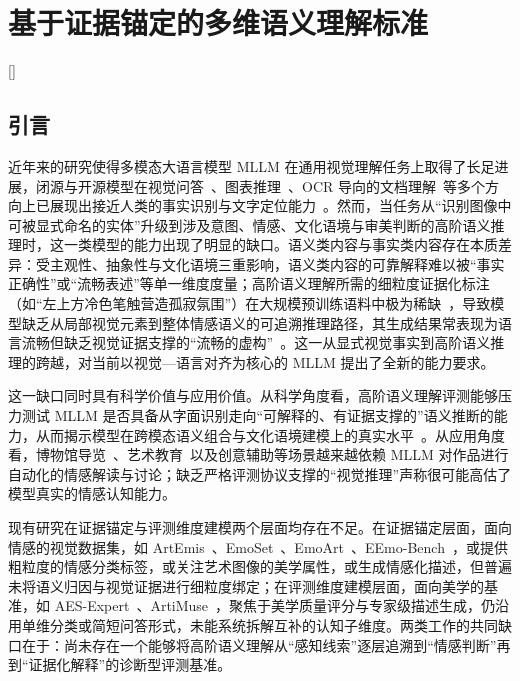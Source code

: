 
\chapter[基于证据锚定的多维语义理解标准]{基于证据锚定的多维语义理解标准}[]
\setcounter{footnote}{0}
\renewcommand{\thefootnote}{\arabic{footnote}}


\section{引言}

近年来的研究使得多模态大语言模型 MLLM 在通用视觉理解任务上取得了长足进展，闭源与开源模型在视觉问答~\cite{kuang2025natural,tang2025mtvqa}、图表推理~\cite{masry2025chartgemma}、OCR 导向的文档理解~\cite{yang2025cc,ye2023mplug}等多个方向上已展现出接近人类的事实识别与文字定位能力~\cite{mmbench2023}。然而，当任务从“识别图像中可被显式命名的实体”升级到涉及意图、情感、文化语境与审美判断的高阶语义推理时，这一类模型的能力出现了明显的缺口。语义类内容与事实类内容存在本质差异：受主观性、抽象性与文化语境三重影响，语义类内容的可靠解释难以被“事实正确性”或“流畅表述”等单一维度度量；高阶语义理解所需的细粒度证据化标注（如“左上方冷色笔触营造孤寂氛围”）在大规模预训练语料中极为稀缺~\cite{aesexpert2024}，导致模型缺乏从局部视觉元素到整体情感语义的可追溯推理路径，其生成结果常表现为语言流畅但缺乏视觉证据支撑的“流畅的虚构”~\cite{eemobench2025}。这一从显式视觉事实到高阶语义推理的跨越，对当前以视觉—语言对齐为核心的 MLLM 提出了全新的能力要求。

这一缺口同时具有科学价值与应用价值。从科学角度看，高阶语义理解评测能够压力测试 MLLM 是否具备从字面识别走向“可解释的、有证据支撑的”语义推断的能力，从而揭示模型在跨模态语义组合与文化语境建模上的真实水平~\cite{liu2025emer}。从应用角度看，博物馆导览~\cite{Balauca_2025_ICCV}、艺术教育~\cite{LEE2024100297}以及创意辅助等场景越来越依赖 MLLM 对作品进行自动化的情感解读与讨论；缺乏严格评测协议支撑的“视觉推理”声称很可能高估了模型真实的情感认知能力。

现有研究在证据锚定与评测维度建模两个层面均存在不足。在证据锚定层面，面向情感的视觉数据集，如 ArtEmis~\cite{achlioptas2021artemis}、EmoSet~\cite{yang2023emoset}、EmoArt~\cite{emoart2025}、EEmo-Bench~\cite{eemobench2025}，或提供粗粒度的情感分类标签，或关注艺术图像的美学属性，或生成情感化描述，但普遍未将语义归因与视觉证据进行细粒度绑定；在评测维度建模层面，面向美学的基准，如 AES-Expert~\cite{aesexpert2024}、ArtiMuse~\cite{cao2025artimuse}，聚焦于美学质量评分与专家级描述生成，仍沿用单维分类或简短问答形式，未能系统拆解互补的认知子维度。两类工作的共同缺口在于：尚未存在一个能够将高阶语义理解从“感知线索”逐层追溯到“情感判断”再到“证据化解释”的诊断型评测基准。

